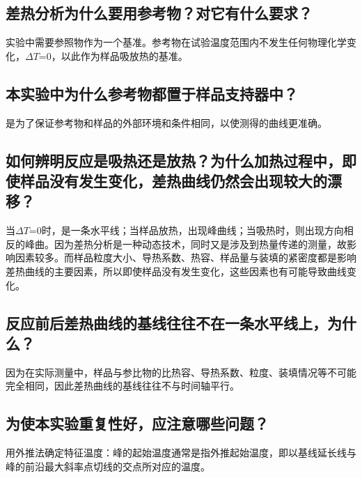 \documentclass[a4paper]{article}
\begin{document}
\subsection{差热分析为什么要用参考物？对它有什么要求？}
实验中需要参照物作为一个基准。参考物在试验温度范围内不发生任何物理化学变化，$\Delta T$=0，以此作为样品吸放热的基准。
\subsection{本实验中为什么参考物都置于样品支持器中？}
是为了保证参考物和样品的外部环境和条件相同，以使测得的曲线更准确。
\subsection{如何辨明反应是吸热还是放热？为什么加热过程中，即使样品没有发生变化，差热曲线仍然会出现较大的漂移？}
当$\Delta T$=0时，是一条水平线；当样品放热，出现峰曲线；当吸热时，则出现方向相反的峰曲。因为差热分析是一种动态技术，同时又是涉及到热量传递的测量，故影响因素较多。而样品粒度大小、导热系数、热容、样品量与装填的紧密度都是影响差热曲线的主要因素，所以即使样品没有发生变化，这些因素也有可能导致曲线变化。
\subsection{反应前后差热曲线的基线往往不在一条水平线上，为什么？}
因为在实际测量中，样品与参比物的比热容、导热系数、粒度、装填情况等不可能完全相同，因此差热曲线的基线往往不与时间轴平行。
\subsection{为使本实验重复性好，应注意哪些问题？}
用外推法确定特征温度：峰的起始温度通常是指外推起始温度，即以基线延长线与峰的前沿最大斜率点切线的交点所对应的温度。

\nocite{jiaocai}

\end{document}
